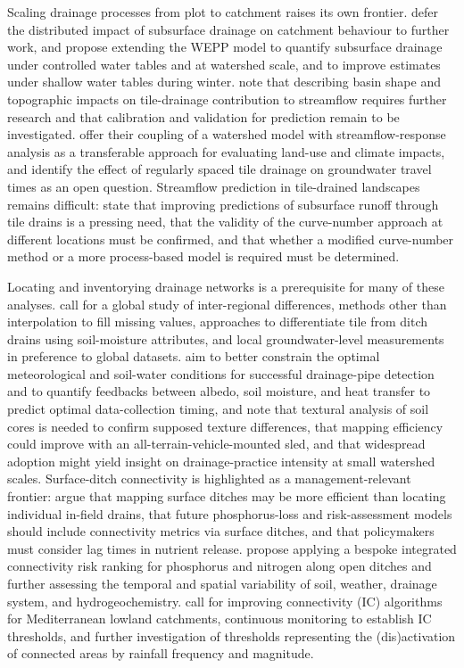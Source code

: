 \documentclass[11pt]{article}
\begin{document}
Scaling drainage processes from plot to catchment raises its own frontier.
\textcite{Muma2016} defer the distributed impact of subsurface drainage on
catchment behaviour to further work, and \textcite{RevueltaAcosta2021} propose
extending the WEPP model to quantify subsurface drainage under controlled water
tables and at watershed scale, and to improve estimates under shallow water
tables during winter. \textcite{Thomas2016} note that describing basin shape
and topographic impacts on tile-drainage contribution to streamflow requires
further research and that calibration and validation for prediction remain to
be investigated. \textcite{Rahman2014} offer their coupling of a watershed
model with streamflow-response analysis as a transferable approach for
evaluating land-use and climate impacts, and \textcite{Schilling2015} identify
the effect of regularly spaced tile drainage on groundwater travel times as an
open question. Streamflow prediction in tile-drained landscapes remains
difficult: \textcite{Wessel2022} state that improving predictions of
subsurface runoff through tile drains is a pressing need, that the validity of
the curve-number approach at different locations must be confirmed, and that
whether a modified curve-number method or a more process-based model is
required must be determined.

Locating and inventorying drainage networks is a prerequisite for many of
these analyses. \textcite{Yimer2023} call for a global study of inter-regional
differences, methods other than interpolation to fill missing values,
approaches to differentiate tile from ditch drains using soil-moisture
attributes, and local groundwater-level measurements in preference to global
datasets. \textcite{Kratt2020} aim to better constrain the optimal
meteorological and soil-water conditions for successful drainage-pipe
detection and to quantify feedbacks between albedo, soil moisture, and heat
transfer to predict optimal data-collection timing, and
\textcite{Allred2018b} note that textural analysis of soil cores is needed to
confirm supposed texture differences, that mapping efficiency could improve
with an all-terrain-vehicle-mounted sled, and that widespread adoption might
yield insight on drainage-practice intensity at small watershed scales.
Surface-ditch connectivity is highlighted as a management-relevant frontier:
\textcite{Moloney2020} argue that mapping surface ditches may be more efficient
than locating individual in-field drains, that future phosphorus-loss and
risk-assessment models should include connectivity metrics via surface ditches,
and that policymakers must consider lag times in nutrient release.
\textcite{Opoku2024} propose applying a bespoke integrated connectivity risk
ranking for phosphorus and nitrogen along open ditches and further assessing
the temporal and spatial variability of soil, weather, drainage system, and
hydrogeochemistry. \textcite{Calsamiglia2018} call for improving connectivity
(IC) algorithms for Mediterranean lowland catchments, continuous monitoring to
establish IC thresholds, and further investigation of thresholds representing
the (dis)activation of connected areas by rainfall frequency and magnitude.
\end{document}
